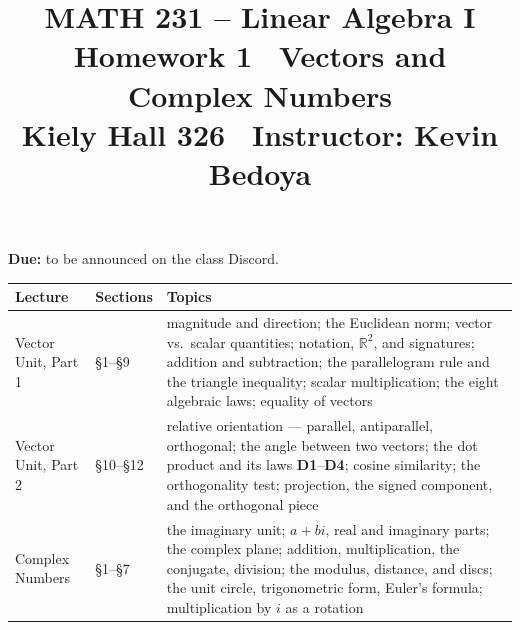 \documentclass[11pt]{article}
\title{\vspace{-1.2cm}\textbf{\sffamily MATH 231 -- Linear Algebra I}\\[4pt]
       {\large\sffamily Homework 1 \textbullet\ Vectors and Complex Numbers}\\[2pt]
       {\normalsize\sffamily Kiely Hall 326 \textbullet\
        Instructor: Kevin Bedoya}}
\author{}
\date{}
\theoremstyle{definition}
\newcommand{\R}{\mathbb{R}}
\newcommand{\duedate}{to be announced on the class Discord}
\begin{document}
\maketitle
\vspace{-1.6cm}

\noindent\textbf{Due:} \duedate.

\medskip
\begin{center}
\renewcommand{\arraystretch}{1.25}
\begin{tabular}{@{}l l >{\raggedright\arraybackslash}p{7.4cm}@{}}
\toprule
\textbf{Lecture} & \textbf{Sections} & \textbf{Topics} \\
\midrule
Vector Unit, Part 1 & \S1--\S9 &
  magnitude and direction; the Euclidean norm; vector vs.\ scalar quantities;
  notation, $\R^{2}$, and signatures; addition and subtraction; the
  parallelogram rule and the triangle inequality; scalar multiplication;
  the eight algebraic laws; equality of vectors \\[3pt]
Vector Unit, Part 2 & \S10--\S12 &
  relative orientation --- parallel, antiparallel, orthogonal; the angle
  between two vectors; the dot product and its laws \textbf{D1}--\textbf{D4};
  cosine similarity; the orthogonality test; projection, the signed component,
  and the orthogonal piece \\[3pt]
Complex Numbers & \S1--\S7 &
  the imaginary unit; $a+bi$, real and imaginary parts; the complex plane;
  addition, multiplication, the conjugate, division; the modulus, distance,
  and discs; the unit circle, trigonometric form, Euler's formula;
  multiplication by $i$ as a rotation \\
\bottomrule
\end{tabular}
\end{center}
\end{document}
